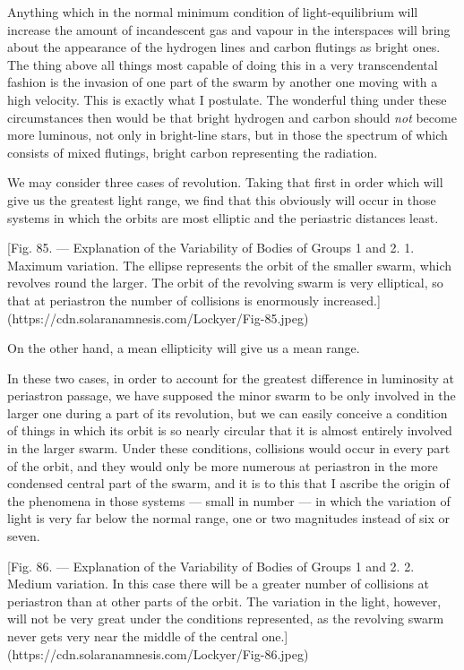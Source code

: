 \documentclass[a4paper, 12pt, oneside, polutonikogreek, english]{article}
\begin{document}
Anything which in the normal minimum condition of light-equilibrium will increase the amount of incandescent gas and vapour in the interspaces will bring about the appearance of the hydrogen lines and carbon flutings as bright ones. The thing above all things most capable of doing this in a very transcendental fashion is the invasion of one part of the swarm by another one moving with a high velocity. This is exactly what I postulate. The wonderful thing under these circumstances then would be that bright hydrogen and carbon should \emph{not} become more luminous, not only in bright-line stars, but in those the spectrum of which consists of mixed flutings, bright carbon representing the radiation.

We may consider three cases of revolution. Taking that first in order which will give us the greatest light range, we find that this obviously will occur in those systems in which the orbits are most elliptic and the periastric distances least.

[Fig. 85. --- Explanation of the Variability of Bodies of Groups 1 and 2. 1. Maximum variation. The ellipse represents the orbit of the smaller swarm, which revolves round the larger. The orbit of the revolving swarm is very elliptical, so that at periastron the number of collisions is enormously increased.](https://cdn.solaranamnesis.com/Lockyer/Fig-85.jpeg)

On the other hand, a mean ellipticity will give us a mean range.

In these two cases, in order to account for the greatest difference in luminosity at periastron passage, we have supposed the minor swarm to be only involved in the larger one during a part of its revolution, but we can easily conceive a condition of things in which its orbit is so nearly circular that it is almost entirely involved in the larger swarm. Under these conditions, collisions would occur in every part of the orbit, and they would only be more numerous at periastron in the more condensed central part of the swarm, and it is to this that I ascribe the origin of the phenomena in those systems --- small in number --- in which the variation of light is very far below the normal range, one or two magnitudes instead of six or seven.

[Fig. 86. --- Explanation of the Variability of Bodies of Groups 1 and 2. 2. Medium variation. In this case there will be a greater number of collisions at periastron than at other parts of the orbit. The variation in the light, however, will not be very great under the conditions represented, as the revolving swarm never gets very near the middle of the central one.](https://cdn.solaranamnesis.com/Lockyer/Fig-86.jpeg)
\end{document}
